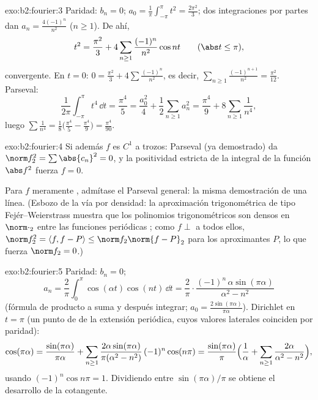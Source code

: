 \begin{solution}{exo:b2:fourier:3}
Paridad: $b_n = 0$; $a_0 = \frac{1}{\pi}\int_{-\pi}^{\pi} t^2 =
\frac{2\pi^2}{3}$; dos integraciones por partes dan $a_n =
\frac{4(-1)^n}{n^2}$ ($n \geq 1$). De ahí,
\[
t^2 = \frac{\pi^2}{3} + 4\sum_{n\geq1}
\frac{(-1)^n}{n^2}\cos nt
\qquad (\abs t \leq \pi),
\]
 convergente. En $t = 0$: $0 = \frac{\pi^2}{3} +
4\sum\frac{(-1)^n}{n^2}$, es decir, $\sum_{n\geq1}
\frac{(-1)^{n+1}}{n^2} = \frac{\pi^2}{12}$. Parseval:
\[
\frac{1}{2\pi}\int_{-\pi}^{\pi} t^4\,\dd t = \frac{\pi^4}{5}
= \frac{a_0^2}{4} + \frac12\sum_{n\geq1} a_n^2
= \frac{\pi^4}{9} + 8\sum_{n\geq1}\frac{1}{n^4} ,
\]
luego $\sum \frac{1}{n^4} = \frac18\bigl(\frac{\pi^4}{5} -
\frac{\pi^4}{9}\bigr) = \frac{\pi^4}{90}$.
\end{solution}

\begin{solution}{exo:b2:fourier:4}
Si además $f$ es $C^1$ a trozos: Parseval (ya demostrado) da $\norm
f_2^2 = \sum\abs{c_n}^2 = 0$, y la positividad estricta de la
integral de la función  $\abs f^2$ fuerza $f = 0$.

Para $f$ meramente , admítase el Parseval general: la misma
demostración de una línea. (Esbozo de la vía por densidad: la
aproximación trigonométrica de tipo Fejér--Weierstrass muestra que
los polinomios trigonométricos son densos en $\norm\cdot_2$ entre las
funciones periódicas ; como $f \perp$ a todos ellos, $\norm
f_2^2 = \langle f, f - P\rangle \leq \norm f_2\norm{f - P}_2$ para
los aproximantes $P$, lo que fuerza $\norm f_2 = 0$.)
\end{solution}

\begin{solution}{exo:b2:fourier:5}
Paridad: $b_n = 0$;
\[
a_n = \frac{2}{\pi}\int_0^\pi \cos(\alpha t)\cos(nt)\,\dd t
= \frac{2}{\pi}\cdot
\frac{(-1)^n\,\alpha\sin(\pi\alpha)}{\alpha^2 - n^2}
\]
(fórmula de producto a suma y después integrar; $a_0 =
\frac{2\sin(\pi\alpha)}{\pi\alpha}$). Dirichlet en $t = \pi$ (un
punto de  de la extensión periódica, cuyos valores
laterales coinciden por paridad):
\[
\cos(\pi\alpha)
= \frac{\sin(\pi\alpha)}{\pi\alpha}
+ \sum_{n\geq1} \frac{2\alpha\sin(\pi\alpha)}{\pi(\alpha^2 -
n^2)}\,(-1)^n\cos(n\pi)
= \frac{\sin(\pi\alpha)}{\pi}\Bigl(\frac{1}{\alpha} +
\sum_{n\geq1}\frac{2\alpha}{\alpha^2 - n^2}\Bigr),
\]
usando $(-1)^n\cos n\pi = 1$. Dividiendo entre $\sin(\pi\alpha)/\pi$
se obtiene el desarrollo de la cotangente.
\end{solution}

